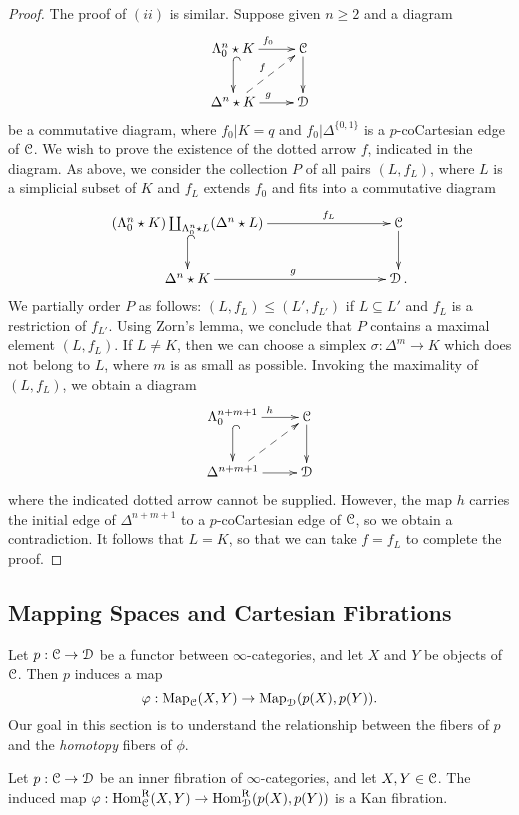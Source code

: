 \begin{proof}
The proof of $(ii)$ is similar. Suppose given $n \geq 2$ and a diagram
$$ \xymatrix{ \Lambda^n_0 \star K \ar[r]^{f_0} \ar@{^{(}->}[d] & \calC \ar[d] \\
\Delta^n \star K \ar[r]^{g} \ar@{-->}[ur]^{f} & \calD }$$
be a commutative diagram, where $f_0 | K = q$ and $f_0 | \Delta^{ \{0,1\} }$ is a $p$-coCartesian edge of $\operatorname{\mathcal{C}}$. We wish to prove the existence of the dotted arrow $f$, indicated in the diagram.
As above, we consider the collection $P$ of all pairs $(L, f_L)$, where $L$ is a simplicial subset of $K$ and $f_L$ extends $f_0$ and fits into a commutative diagram
$$ \xymatrix{ (\Lambda^n_0 \star K) \coprod_{ \Lambda^n_0 \star L} (\Delta^n \star L) \ar[rrr]^-{f_L} \ar@{^{(}->}[d] & & &  \calC \ar[d] \\
\Delta^n \star K \ar[rrr]^{g} & & & \calD. }$$
We partially order $P$ as follows: $(L, f_L) \leq (L', f_{L'})$ if $L \subseteq L'$ and $f_L$ is a restriction of $f_{L'}$. Using Zorn's lemma, we conclude that $P$ contains a maximal element
$(L, f_L)$. If $L \neq K$, then we can choose a simplex $\sigma: \Delta^m \rightarrow K$ which does not belong to $L$, where $m$ is as small as possible. Invoking the maximality of $(L,f_L)$, we obtain a diagram
$$ \xymatrix{ \Lambda^{n+m+1}_{0} \ar[r]^{h} \ar@{^{(}->}[d] & \calC \ar[d] \\
\Delta^{n+m+1} \ar[r] \ar@{-->}[ur] & \calD }$$
where the indicated dotted arrow cannot be supplied. However, the map $h$ carries the initial edge of $\Delta^{n+m+1}$ to a $p$-coCartesian edge of $\operatorname{\mathcal{C}}$, so we obtain a contradiction. It follows that $L = K$, so that we can take $f = f_L$ to complete the proof.
\end{proof}

\subsection{Mapping Spaces and Cartesian Fibrations}\label{slik}

Let $p: \operatorname{\mathcal{C}} \rightarrow \operatorname{\mathcal{D}}$ be a functor between $\infty$-categories, and let
$X$ and $Y$ be objects of $\operatorname{\mathcal{C}}$. Then $p$ induces a map
$$ \varphi: \operatorname{{Map}}_{\operatorname{\mathcal{C}}}(X,Y) \rightarrow \operatorname{{Map}}_{\operatorname{\mathcal{D}}}(p(X),p(Y)).$$
Our goal in this section is to understand the relationship between the fibers of $p$ and the {\em homotopy} fibers of $\phi$.

\begin{lemma}\label{sharpy}
Let $p: \operatorname{\mathcal{C}} \rightarrow \operatorname{\mathcal{D}}$ be an inner fibration of $\infty$-categories, and let $X,Y \in \operatorname{\mathcal{C}}$. The induced map $\varphi: \operatorname{Hom}^{\operatorname{R}}_{\operatorname{\mathcal{C}}}(X,Y) \rightarrow \operatorname{Hom}^{\operatorname{R}}_{\operatorname{\mathcal{D}}}(p(X),p(Y))$ is a Kan fibration.
\end{lemma}

